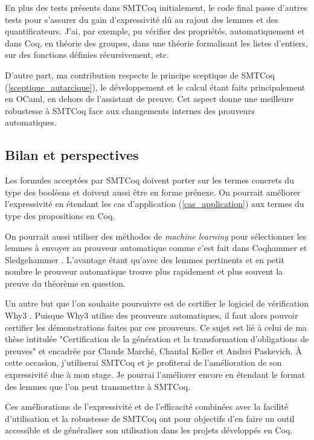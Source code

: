 \documentclass[11pt]{article}
\begin{document}
En plus des tests présents dans SMTCoq initialement, le code final passe d'autres tests pour s'assurer du gain d'expressivité dû au rajout des lemmes et des quantificateurs. J'ai, par exemple, pu vérifier des propriétés, automatiquement et dans Coq, en théorie des groupes, dans une théorie formalisant les listes d'entiers, sur des fonctions définies récursivement, etc.

D'autre part, ma contribution respecte le principe sceptique de SMTCoq (\ref{sceptique_autarcique}), le développement et le calcul étant faits principalement en OCaml, en dehors de l'assistant de preuve. Cet aspect donne une meilleure robustesse à SMTCoq face aux changements internes des prouveurs automatiques.


\subsection{Bilan et perspectives}\label{persp}

Les formules acceptées par SMTCoq doivent porter sur les termes concrets du type des booléens et doivent aussi être en forme prénexe. On pourrait améliorer l'expressivité en étendant les cas d'application (\ref{cas_application}) aux termes du type des propositions en Coq.

On pourrait aussi utiliser des méthodes de \textit{machine learning} pour sélectionner les lemmes à envoyer au prouveur automatique comme c'est fait dans Coqhammer et Sledgehammer \cite{hol_selector, coqhammer}. L'avantage étant qu'avec des lemmes pertinents et en petit nombre le prouveur automatique trouve plus rapidement et plus souvent la preuve du théorème en question.

Un autre but que l'on souhaite poursuivre est de certifier le logiciel de vérification Why3 \cite{why3_intro}. Puisque Why3 utilise des prouveurs automatiques, il faut alors pouvoir certifier les démonstrations faites par ces prouveurs. Ce sujet est lié à celui de ma thèse intitulée "Certification de la génération et la transformation d'obligations de preuves" et encadrée par Claude Marché, Chantal Keller et Andrei Paskevich. À cette occasion, j'utiliserai SMTCoq et je profiterai de l'amélioration de son expressivité due à mon stage. Je pourrai l'améliorer encore en étendant le format des lemmes que l'on peut transmettre à SMTCoq. \medbreak

Ces améliorations de l'expressivité et de l'efficacité combinées avec la facilité d'utilisation et la robustesse de SMTCoq ont pour objectifs d'en faire un outil accessible et de généraliser son utilisation dans les projets développés en Coq.
\end{document}
